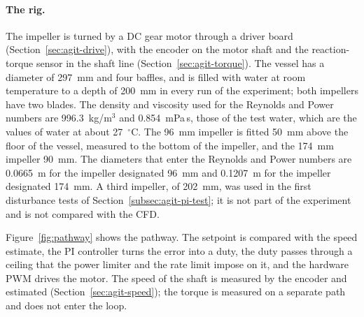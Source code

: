 \paragraph{The rig.}
The impeller is turned by a DC gear motor through a driver board (Section~\ref{sec:agit-drive}), with the encoder on the motor shaft and the reaction-torque sensor in the shaft line (Section~\ref{sec:agit-torque}). The vessel has a diameter of 297~mm and four baffles, and is filled with water at room temperature to a depth of 200~mm in every run of the experiment; both impellers have two blades. The density and viscosity used for the Reynolds and Power numbers are 996.3~kg/m$^3$ and 0.854~mPa\,s, those of the test water, which are the values of water at about 27~$^{\circ}$C. %
The 96~mm impeller is fitted 50~mm above the floor of the vessel, measured to the bottom of the impeller, and the 174~mm impeller 90~mm. The diameters that enter the Reynolds and Power numbers are 0.0665~m for the impeller designated 96~mm and 0.1207~m for the impeller designated 174~mm. A third impeller, of 202~mm, was used in the first disturbance tests of Section~\ref{subsec:agit-pi-test}; it is not part of the experiment and is not compared with the CFD.

Figure~\ref{fig:pathway} shows the pathway. The setpoint is compared with the speed estimate, the PI controller turns the error into a duty, the duty passes through a ceiling that the power limiter and the rate limit impose on it, and the hardware PWM drives the motor. The speed of the shaft is measured by the encoder and estimated (Section~\ref{sec:agit-speed}); the torque is measured on a separate path and does not enter the loop.

